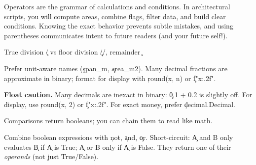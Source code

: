 Operators are the grammar of calculations and conditions. In architectural scripts, you will compute areas,
combine flags, filter data, and build clear conditions. Knowing the exact behavior prevents subtle mistakes,
and using parentheses communicates intent to future readers (and your future self!).

True division \c{/} vs floor division \c{//}, remainder \c{%
Prefer unit-aware names (\c{span_m}, \c{area_m2}). Many decimal fractions are approximate in binary; format for display with
\c{round(x, n)} or \c{f"{x:.2f}"}.



\begin{NoteBox}
\textbf{Float caution.} Many decimals are inexact in binary: \c{0.1 + 0.2} is slightly off.
For display, use \c{round(x, 2)} or \c{f"{x:.2f}"}. For exact money, prefer \c{decimal.Decimal}.
\end{NoteBox}

Comparisons return booleans; you can chain them to read like math.



Combine boolean expressions with \c{not}, \c{and}, \c{or}. Short-circuit:
\c{A and B} only evaluates \c{B} if \c{A} is True; \c{A or B} only if \c{A} is False.
They return one of their \emph{operands} (not just True/False).

}
